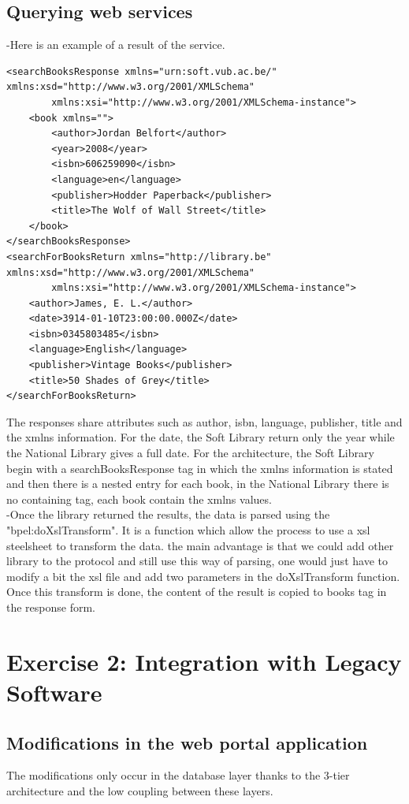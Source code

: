 \documentclass[a4paper,10pt]{article}
\begin{document}
\subsection{Querying web services}
-Here is an example of a result of the service.
\begin{verbatim}
<searchBooksResponse xmlns="urn:soft.vub.ac.be/" xmlns:xsd="http://www.w3.org/2001/XMLSchema"
        xmlns:xsi="http://www.w3.org/2001/XMLSchema-instance">
    <book xmlns="">
        <author>Jordan Belfort</author>
        <year>2008</year>
        <isbn>606259090</isbn>
        <language>en</language>
        <publisher>Hodder Paperback</publisher>
        <title>The Wolf of Wall Street</title>
    </book>
</searchBooksResponse>
<searchForBooksReturn xmlns="http://library.be" xmlns:xsd="http://www.w3.org/2001/XMLSchema" 
        xmlns:xsi="http://www.w3.org/2001/XMLSchema-instance">
    <author>James, E. L.</author>
    <date>3914-01-10T23:00:00.000Z</date>
    <isbn>0345803485</isbn>
    <language>English</language>
    <publisher>Vintage Books</publisher>
    <title>50 Shades of Grey</title>
</searchForBooksReturn>
\end{verbatim}
The responses share attributes such as author, isbn, language, publisher, title and the xmlns information. For the date, the Soft Library return only the year while the National Library gives a full date. For the architecture, the Soft Library begin with a searchBooksResponse tag in which the xmlns information is stated and then there is a nested entry for each book, in the National Library there is no containing tag, each book contain the xmlns values.\\

-Once the library returned the results, the data is parsed using the "bpel:doXslTransform". It is a function which allow the process to use a xsl steelsheet to transform the data. the main advantage is that we could add other library to the protocol and still use this way of parsing, one would just have to modify a bit the xsl file and add two parameters in the doXslTransform function. Once this transform is done, the content of the result is copied to books tag in the response form.

\section{Exercise 2: Integration with Legacy Software}
\subsection{Modifications in the web portal application}
The modifications only occur in the database layer thanks to the 3-tier architecture and the low coupling between these layers.
\end{document}
